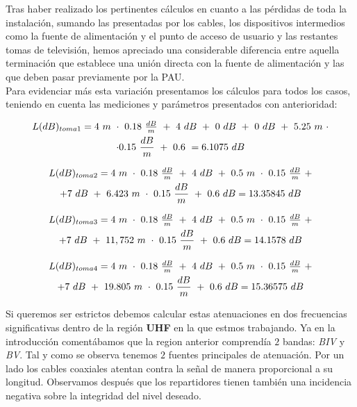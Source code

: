 \documentclass{article}[12 pt]
\begin{document}
			\vskip 3mm

			Tras haber realizado los pertinentes cálculos en cuanto a las pérdidas de toda la instalación, sumando las presentadas por los cables, los dispositivos intermedios como la fuente de alimentación y el punto de acceso de usuario y las restantes tomas de televisión, hemos apreciado una considerable diferencia entre aquella terminación que establece una unión directa con la fuente de alimentación y las que deben pasar previamente por la PAU.\\

			Para evidenciar más esta variación presentamos los cálculos para todos los casos, teniendo en cuenta las mediciones y parámetros presentados con anterioridad:

			\begin{multline*}
				$$L(dB)_{toma1} = 4\ m\ \cdot\ 0.18\ \frac{dB}{m}\ +\ 4\ dB\ +\ 0\ dB\ +\ 0\ dB\ +\ 5.25\ m\ \cdot\\
				\cdot 0.15\ \frac{dB}{m}\ +\ 0.6\ = 6.1075\ dB$$
			\end{multline*}

			\begin{multline*}
				$$L(dB)_{toma2} = 4\ m\ \cdot\ 0.18\ \frac{dB}{m}\ +\ 4\ dB\ +\ 0.5\ m\ \cdot\ 0.15\ \frac{dB}{m}\ +\\
				+ 7\ dB\ +\ 6.423\ m\ \cdot\ 0.15\ \frac{dB}{m}\ +\ 0.6\ dB = 13.35845\ dB$$
			\end{multline*}

			\begin{multline*}
				$$L(dB)_{toma3} = 4\ m\ \cdot\ 0.18\ \frac{dB}{m}\ +\ 4\ dB\ +\ 0.5\ m\ \cdot\ 0.15\ \frac{dB}{m}\ +\\
				+ 7\ dB\ +\ 11,752\ m\ \cdot\ 0.15\ \frac{dB}{m}\ +\ 0.6\ dB = 14.1578\ dB$$
			\end{multline*}

			\begin{multline*}
				$$L(dB)_{toma4} = 4\ m\ \cdot\ 0.18\ \frac{dB}{m}\ +\ 4\ dB\ +\ 0.5\ m\ \cdot\ 0.15\ \frac{dB}{m}\ +\\
				+ 7\ dB\ +\ 19.805\ m\ \cdot\ 0.15\ \frac{dB}{m}\ +\ 0.6\ dB = 15.36575\ dB$$
			\end{multline*}

			Si queremos ser estrictos debemos calcular estas atenuaciones en dos frecuencias significativas dentro de la región \textbf{UHF} en la que estmos trabajando. Ya en la introducción comentábamos que la region anterior comprendía $2$ bandas: \textit{BIV} y \textit{BV}. Tal y como se observa tenemos $2$ fuentes principales de atenuación. Por un lado los cables coaxiales atentan contra la señal de manera proporcional a su longitud. Observamos después que los repartidores tienen también una incidencia negativa sobre la integridad del nivel deseado.\\
\end{document}
